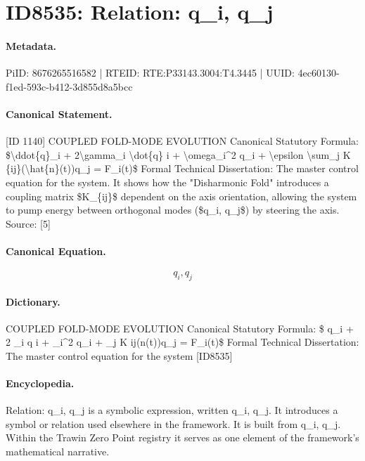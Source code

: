 \section*{ID8535: Relation: q\_i, q\_j}
\paragraph{Metadata.}
PiID: 8676265516582 | RTEID: RTE:P33143.3004:T4.3445 | UUID: 4ec60130-f1ed-593c-b412-3d855d8a5bcc

\paragraph{Canonical Statement.}
[ID 1140] COUPLED FOLD-MODE EVOLUTION Canonical Statutory Formula: \$\textbackslash{}ddot\{q\}\_i + 2\textbackslash{}gamma\_i \textbackslash{}dot\{q\} i + \textbackslash{}omega\_i\textasciicircum{}2 q\_i + \textbackslash{}epsilon \textbackslash{}sum\_j K \{ij\}(\textbackslash{}hat\{n\}(t))q\_j = F\_i(t)\$ Formal Technical Dissertation: The master control equation for the system. It shows how the "Disharmonic Fold" introduces a coupling matrix \$K\_\{ij\}\$ dependent on the axis orientation, allowing the system to pump energy between orthogonal modes (\$q\_i, q\_j\$) by steering the axis. Source: [5]

\paragraph{Canonical Equation.}
\[
q_i, q_j
\]

\paragraph{Dictionary.}
COUPLED FOLD-MODE EVOLUTION Canonical Statutory Formula: \$ q\_i + 2 \_i q i + \_i\textasciicircum{}2 q\_i + \_j K ij(n(t))q\_j = F\_i(t)\$ Formal Technical Dissertation: The master control equation for the system [ID8535]

\paragraph{Encyclopedia.}
Relation: q\_i, q\_j is a symbolic expression, written q\_i, q\_j. It introduces a symbol or relation used elsewhere in the framework. It is built from q\_i, q\_j. Within the Trawin Zero Point registry it serves as one element of the framework's mathematical narrative.
